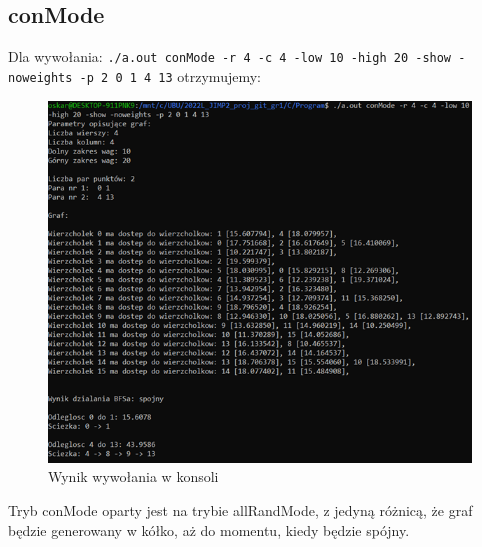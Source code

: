 \documentclass{article}
\begin{document}
\subsection{conMode}
Dla wywołania: \texttt{./a.out conMode -r 4 -c 4 -low 10 -high 20 -show -noweights -p 2 0 1 4 13} otrzymujemy:
\begin{figure}[h]
\centering
\includegraphics[width=1\textwidth]{obraz2.png}
\caption{\label{fig:mod}Wynik wywołania w konsoli}
\end{figure}

 
Tryb conMode oparty jest na trybie allRandMode, z jedyną różnicą, że graf będzie generowany w kółko, aż do momentu, kiedy będzie spójny. \pagebreak
\end{document}
